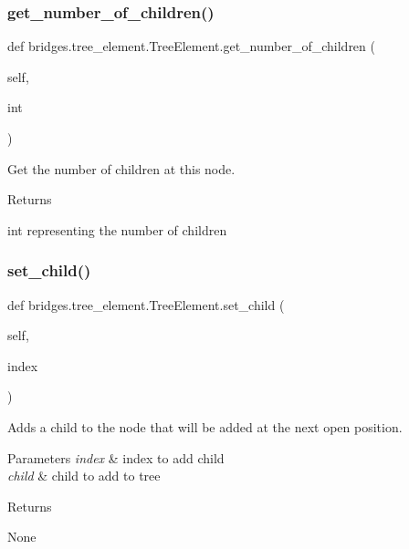 \subsubsection{\texorpdfstring{get\+\_\+number\+\_\+of\+\_\+children()}{get\_number\_of\_children()}}
{\footnotesize\ttfamily def bridges.\+tree\+\_\+element.\+Tree\+Element.\+get\+\_\+number\+\_\+of\+\_\+children (\begin{DoxyParamCaption}\item[{}]{self,  }\item[{}]{int }\end{DoxyParamCaption})}



Get the number of children at this node. 

\begin{DoxyReturn}{Returns}


int representing the number of children 
\end{DoxyReturn}
\mbox{\label{classbridges_1_1tree__element_1_1_tree_element_adb855562b31567f39e41e312f87ab98b}} 
\subsubsection{\texorpdfstring{set\+\_\+child()}{set\_child()}}
{\footnotesize\ttfamily def bridges.\+tree\+\_\+element.\+Tree\+Element.\+set\+\_\+child (\begin{DoxyParamCaption}\item[{}]{self,  }\item[{}]{index }\end{DoxyParamCaption})}



Adds a child to the node that will be added at the next open position. 


\begin{DoxyParams}{Parameters}
{\em index} & index to add child \\
\hline
{\em child} & child to add to tree \\
\hline
\end{DoxyParams}
\begin{DoxyReturn}{Returns}


None
\end{DoxyReturn}

